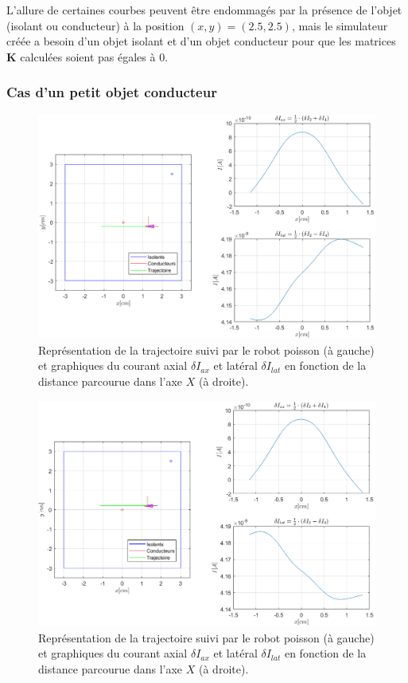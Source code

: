 L'allure de certaines courbes peuvent être endommagés par la présence de l'objet (isolant ou conducteur) à la position $(x,y) = (2.5, 2.5)$, mais le simulateur créée a besoin d'un objet isolant et d'un objet conducteur pour que les matrices $\mathbf{K}$ calculées soient pas égales à $0$.

\subsubsection{Cas d'un petit objet conducteur}
\begin{figure}[h!]
    \centering
    \includegraphics[width=\textwidth]{assets/plot_currents/Table1/conducteur_bas.png}
    \caption{\centering Représentation de la trajectoire suivi par le robot poisson (à gauche) et graphiques du courant axial $\delta I_{ax}$ et latéral $\delta I_{lat}$ en fonction de la distance parcourue dans l'axe $X$ (à droite).}
    \label{fig:conducteur_bas}
\end{figure}

\begin{figure}[h!]
    \centering
    \includegraphics[width=\textwidth]{assets/plot_currents/Table1/conducteur_haut.png}
    \caption{\centering Représentation de la trajectoire suivi par le robot poisson (à gauche) et graphiques du courant axial $\delta I_{ax}$ et latéral $\delta I_{lat}$ en fonction de la distance parcourue dans l'axe $X$ (à droite).}
    \label{fig:conducteur_haut}
\end{figure}
\clearpage

